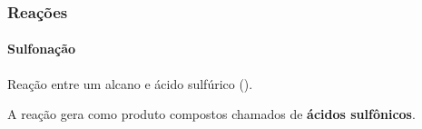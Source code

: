 \begin{frame}
\frametitle{Reações}
\framesubtitle{Sulfonação}

Reação entre um alcano e ácido sulfúrico ().

\begin{figure}
\centering
{}
\end{figure}

A reação gera como produto compostos chamados de \textbf{ácidos sulfônicos}.

\end{frame}
